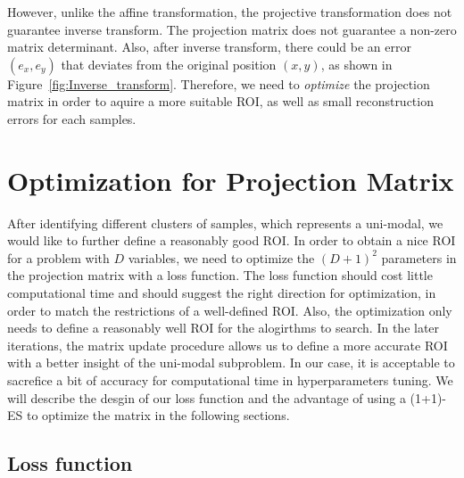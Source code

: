 However, unlike the affine transformation, the projective transformation does not guarantee inverse transform.
The projection matrix does not guarantee a non-zero matrix determinant.
Also, after inverse transform, 
there could be an error $(e_x, e_y)$ that deviates from the original position $(x, y)$, as shown in Figure~\ref{fig:Inverse_transform}.
Therefore, we need to \textit{optimize} the projection matrix in order to aquire a more suitable ROI, 
as well as small reconstruction errors for each samples.





\section{Optimization for Projection Matrix}

After identifying different clusters of samples, which represents a uni-modal, 
we would like to further define a reasonably good ROI.
In order to obtain a nice ROI for a problem with $D$ variables, 
we need to optimize the $(D+1)^2$ parameters in the projection matrix with a loss function.
The loss function should cost little computational time and should suggest the right direction for optimization, 
in order to match the restrictions of a well-defined ROI.
Also, the optimization only needs to define a reasonably well ROI for the alogirthms to search.  
In the later iterations, the matrix update procedure allows us to define a more accurate ROI with a better insight of the uni-modal subproblem.
In our case, it is acceptable to sacrefice a bit of accuracy for computational time in hyperparameters tuning.  
We will describe the desgin of our loss function and the advantage of using a (1+1)-ES to optimize the matrix in the following sections.  


\subsection{Loss function}

